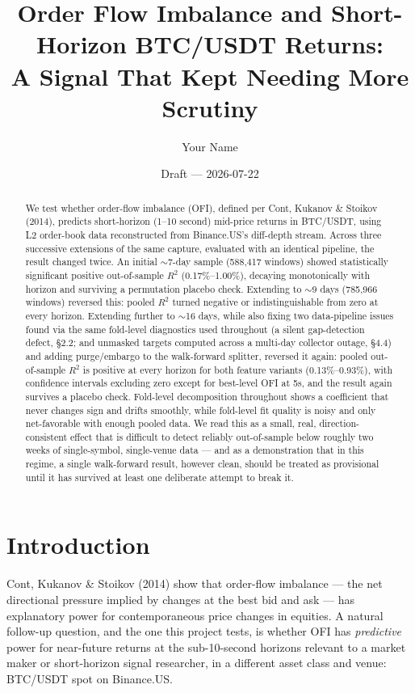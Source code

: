 \documentclass[11pt]{article}
\title{Order Flow Imbalance and Short-Horizon BTC/USDT Returns:\\ A Signal That Kept Needing More Scrutiny}
\author[Your Name]{Your Name}
\date{Draft --- 2026-07-22}
\begin{document}
\maketitle

\begin{abstract}
We test whether order-flow imbalance (OFI), defined per Cont, Kukanov \& Stoikov (2014), predicts short-horizon (1--10 second) mid-price returns in BTC/USDT, using L2 order-book data reconstructed from Binance.US's diff-depth stream. Across three successive extensions of the same capture, evaluated with an identical pipeline, the result changed twice. An initial $\sim$7-day sample (588{,}417 windows) showed statistically significant positive out-of-sample $R^2$ (0.17\%--1.00\%), decaying monotonically with horizon and surviving a permutation placebo check. Extending to $\sim$9 days (785{,}966 windows) reversed this: pooled $R^2$ turned negative or indistinguishable from zero at every horizon. Extending further to $\sim$16 days, while also fixing two data-pipeline issues found via the same fold-level diagnostics used throughout (a silent gap-detection defect, \S2.2; and unmasked targets computed across a multi-day collector outage, \S4.4) and adding purge/embargo to the walk-forward splitter, reversed it again: pooled out-of-sample $R^2$ is positive at every horizon for both feature variants (0.13\%--0.93\%), with confidence intervals excluding zero except for best-level OFI at 5s, and the result again survives a placebo check. Fold-level decomposition throughout shows a coefficient that never changes sign and drifts smoothly, while fold-level fit quality is noisy and only net-favorable with enough pooled data. We read this as a small, real, direction-consistent effect that is difficult to detect reliably out-of-sample below roughly two weeks of single-symbol, single-venue data --- and as a demonstration that in this regime, a single walk-forward result, however clean, should be treated as provisional until it has survived at least one deliberate attempt to break it.
\end{abstract}

\section{Introduction}

Cont, Kukanov \& Stoikov (2014) show that order-flow imbalance --- the net directional pressure implied by changes at the best bid and ask --- has explanatory power for contemporaneous price changes in equities. A natural follow-up question, and the one this project tests, is whether OFI has \emph{predictive} power for near-future returns at the sub-10-second horizons relevant to a market maker or short-horizon signal researcher, in a different asset class and venue: BTC/USDT spot on Binance.US.
\end{document}
